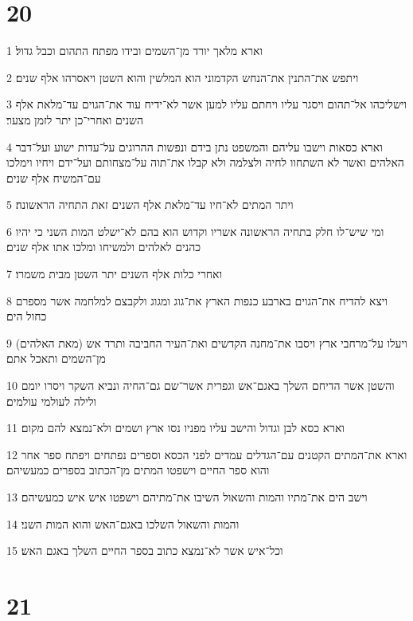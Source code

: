 \chapter{20}

\par 1 וארא מלאך יורד מן־השמים ובידו מפתח התהום וכבל גדול׃
\par 2 ויתפש את־התנין את־הנחש הקדמוני הוא המלשין והוא השטן ויאסרהו אלף שנים׃
\par 3 וישליכהו אל־תהום ויסגר עליו ויחתם עליו למען אשר לא־ידיח עוד את־הגוים עד־מלאת אלף השנים ואחרי־כן יתר לזמן מצער׃
\par 4 וארא כסאות וישבו עליהם והמשפט נתן בידם ונפשות ההרוגים על־עדות ישוע ועל־דבר האלהים ואשר לא השתחוו לחיה ולצלמה ולא קבלו את־תוה על־מצחותם ועל־ידם ויחיו וימלכו עם־המשיח אלף שנים׃
\par 5 ויתר המתים לא־חיו עד־מלאת אלף השנים זאת התחיה הראשונה׃
\par 6 ומי שיש־לו חלק בתחיה הראשונה אשריו וקדוש הוא בהם לא־ישלט המות השני כי יהיו כהנים לאלהים ולמשיחו ומלכו אתו אלף שנים׃
\par 7 ואחרי כלות אלף השנים יתר השטן מבית משמרו׃
\par 8 ויצא להדיח את־הגוים בארבע כנפות הארץ את־גוג ומגוג ולקבצם למלחמה אשר מספרם כחול הים׃
\par 9 ויעלו על־מרחבי ארץ ויסבו את־מחנה הקדשים ואת־העיר החביבה ותרד אש (מאת האלהים) מן־השמים ותאכל אתם׃
\par 10 והשטן אשר הדיחם השלך באגם־אש וגפרית אשר־שם גם־החיה ונביא השקר ויסרו יומם ולילה לעולמי עולמים׃
\par 11 וארא כסא לבן וגדול והישב עליו מפניו נסו ארץ ושמים ולא־נמצא להם מקום׃
\par 12 וארא את־המתים הקטנים עם־הגדלים עמדים לפני הכסא וספרים נפתחים ויפתח ספר אחר והוא ספר החיים וישפטו המתים מן־הכתוב בספרים כמעשיהם׃
\par 13 וישב הים את־מתיו והמות והשאול השיבו את־מתיהם וישפטו איש איש כמעשיהם׃
\par 14 והמות והשאול השלכו באגם־האש והוא המות השני׃
\par 15 וכל־איש אשר לא־נמצא כתוב בספר החיים השלך באגם האש׃

\chapter{21}

